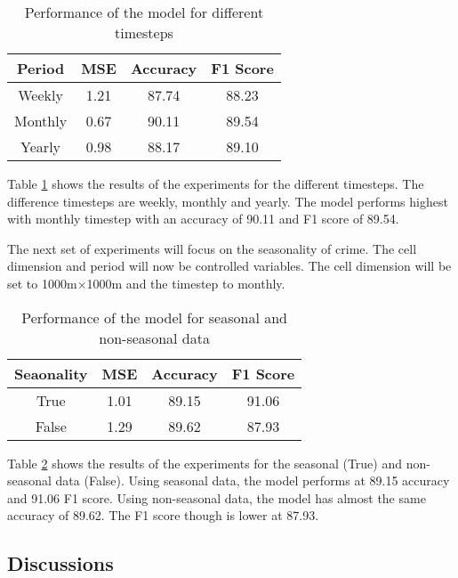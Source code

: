     \begin{table}[H]
      \centering
      \begin{tabular}{|c|c|c|c|}
            \hline
          \textbf{Period}  &\textbf{MSE}  &\textbf{Accuracy} &\textbf{F1 Score}\\ 
          \hline
          Weekly &1.21 &87.74 &88.23 \\
          Monthly &0.67 &90.11 &89.54 \\
          Yearly   &0.98 &88.17 &89.10 \\
          \hline
        \end{tabular}
      \caption{Performance of the model for different timesteps}
      \label{table:timestep-results}
    \end{table}
    Table \ref{table:timestep-results} shows the results of the experiments for the different timesteps. The difference timesteps are weekly, monthly and yearly. The model performs highest with monthly timestep with an accuracy of 90.11 and F1 score of 89.54.

    The next set of experiments will focus on the seasonality of crime. The cell dimension and period will now be controlled variables. The cell dimension will be set to 1000m\(\times\)1000m and the timestep to monthly.

    \begin{table}[H]
      \centering
      \begin{tabular}{|c|c|c|c|}
            \hline
          \textbf{Seaonality}  &\textbf{MSE}  &\textbf{Accuracy} &\textbf{F1 Score}\\ 
          \hline
          True &1.01 &89.15 &91.06\\
          False  &1.29 &89.62 &87.93 \\
          \hline
        \end{tabular}
      \caption{Performance of the model for seasonal and non-seasonal data}
      \label{table:seasonal-results}
    \end{table}
    Table \ref{table:seasonal-results} shows the results of the experiments for the seasonal (True) and non-seasonal data (False). Using seasonal data, the model performs at 89.15 accuracy and 91.06 F1 score. Using non-seasonal data, the model has almost the same accuracy of 89.62. The F1 score though is lower at 87.93.

\subsection{Discussions}

